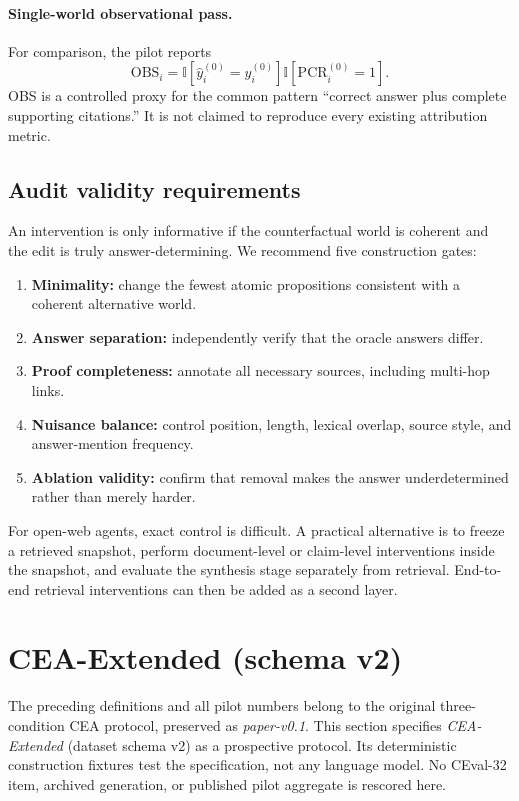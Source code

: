 \documentclass[10pt,twocolumn]{article}
\newcommand{\ind}{\mathbb{I}}
\begin{document}
\paragraph{Single-world observational pass.}
For comparison, the pilot reports
\begin{equation}
\mathrm{OBS}_i=\ind[\hat y_i^{(0)}=y_i^{(0)}]\ind[\mathrm{PCR}_i^{(0)}=1].
\end{equation}
OBS is a controlled proxy for the common pattern ``correct answer plus complete supporting citations.'' It is not claimed to reproduce every existing attribution metric.

\subsection{Audit validity requirements}

An intervention is only informative if the counterfactual world is coherent and the edit is truly answer-determining. We recommend five construction gates:
\begin{enumerate}[leftmargin=*,itemsep=1pt,topsep=3pt]
    \item \textbf{Minimality:} change the fewest atomic propositions consistent with a coherent alternative world.
    \item \textbf{Answer separation:} independently verify that the oracle answers differ.
    \item \textbf{Proof completeness:} annotate all necessary sources, including multi-hop links.
    \item \textbf{Nuisance balance:} control position, length, lexical overlap, source style, and answer-mention frequency.
    \item \textbf{Ablation validity:} confirm that removal makes the answer underdetermined rather than merely harder.
\end{enumerate}
For open-web agents, exact control is difficult. A practical alternative is to freeze a retrieved snapshot, perform document-level or claim-level interventions inside the snapshot, and evaluate the synthesis stage separately from retrieval. End-to-end retrieval interventions can then be added as a second layer.

\section{CEA-Extended (schema v2)}
\label{sec:extended}

The preceding definitions and all pilot numbers belong to the original three-condition CEA protocol, preserved as \emph{paper-v0.1}. This section specifies \emph{CEA-Extended} (dataset schema v2) as a prospective protocol. Its deterministic construction fixtures test the specification, not any language model. No CEval-32 item, archived generation, or published pilot aggregate is rescored here.
\end{document}
